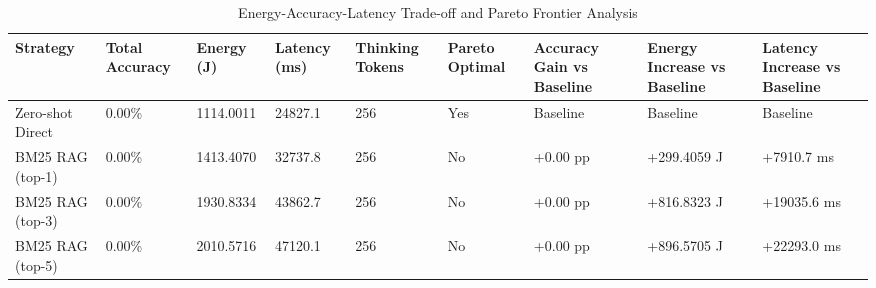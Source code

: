 \begin{table}
\caption{Energy-Accuracy-Latency Trade-off and Pareto Frontier Analysis}
\label{tab:tradeoff_comparison}
\begin{tabular}{lllllllll}
\toprule
Strategy & Total Accuracy & Energy (J) & Latency (ms) & Thinking Tokens & Pareto Optimal & Accuracy Gain vs Baseline & Energy Increase vs Baseline & Latency Increase vs Baseline \\
\midrule
Zero-shot Direct & 0.00\% & 1114.0011 & 24827.1 & 256 & Yes & Baseline & Baseline & Baseline \\
BM25 RAG (top-1) & 0.00\% & 1413.4070 & 32737.8 & 256 & No & +0.00 pp & +299.4059 J & +7910.7 ms \\
BM25 RAG (top-3) & 0.00\% & 1930.8334 & 43862.7 & 256 & No & +0.00 pp & +816.8323 J & +19035.6 ms \\
BM25 RAG (top-5) & 0.00\% & 2010.5716 & 47120.1 & 256 & No & +0.00 pp & +896.5705 J & +22293.0 ms \\
\bottomrule
\end{tabular}
\end{table}
